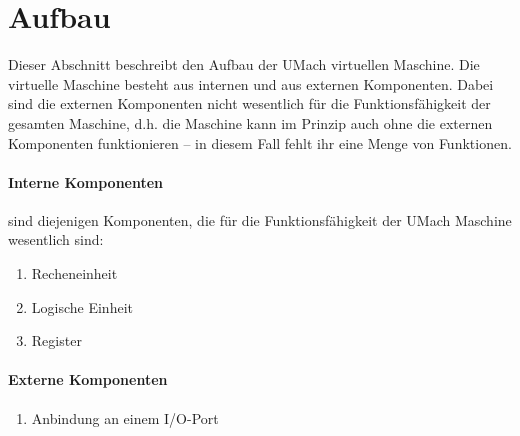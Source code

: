 \section{Aufbau}
\label{sec:Aufbau}
Dieser Abschnitt beschreibt den Aufbau der UMach virtuellen Maschine.
Die virtuelle Maschine besteht aus internen und aus externen Komponenten. Dabei
sind die externen Komponenten nicht wesentlich für die Funktionsfähigkeit der
gesamten Maschine, d.h. die Maschine kann im Prinzip auch ohne die externen
Komponenten funktionieren -- in diesem Fall fehlt ihr eine Menge von Funktionen.

\paragraph{Interne Komponenten}
sind diejenigen Komponenten, die für die Funktionsfähigkeit der UMach
Maschine wesentlich sind:
\begin{enumerate}
  \item Recheneinheit
  \item Logische Einheit
  \item Register
\end{enumerate}


\paragraph{Externe Komponenten}

\begin{enumerate}
  \item Anbindung an einem I/O-Port
\end{enumerate}






